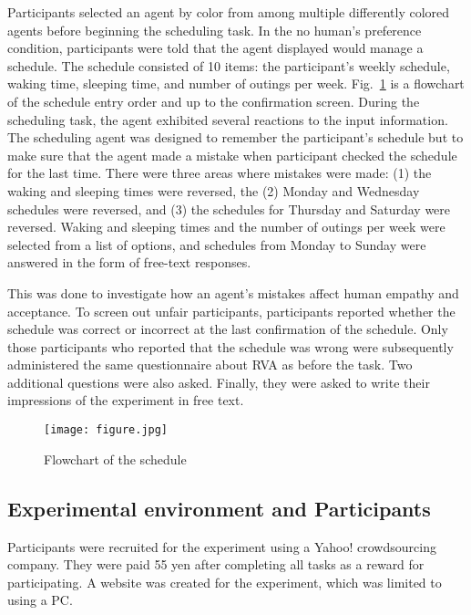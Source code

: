 \documentclass[runningheads]{llncs}
\begin{document}
Participants selected an agent by color from among multiple differently colored agents before beginning the scheduling task. 
In the no human's preference condition, participants were told that the agent displayed would manage a schedule. 
The schedule consisted of 10 items: the participant's weekly schedule, waking time, sleeping time, and number of outings per week. 
Fig.~\ref{flowchart} is a flowchart of the schedule entry order and up to the confirmation screen.
During the scheduling task, the agent exhibited several reactions to the input information. 
The scheduling agent was designed to remember the participant's schedule but to make sure that the agent made a mistake when participant checked the schedule for the last time. 
There were three areas where mistakes were made: 
(1) the waking and sleeping times were reversed, the (2) Monday and Wednesday schedules were reversed, and (3) the schedules for Thursday and Saturday were reversed.
Waking and sleeping times and the number of outings per week were selected from a list of options, and schedules from Monday to Sunday were answered in the form of free-text responses.

This was done to investigate how an agent's mistakes affect human empathy and acceptance. 
To screen out unfair participants, participants reported whether the schedule was correct or incorrect at the last confirmation of the schedule. 
Only those participants who reported that the schedule was wrong were subsequently administered the same questionnaire about RVA as before the task. 
Two additional questions were also asked. 
Finally, they were asked to write their impressions of the experiment in free text.

\begin{figure}[tbp]
		\begin{center}
		\texttt{[image: figure.jpg]}
		\caption{Flowchart of the schedule}
		\label{flowchart}
	\end{center}
\end{figure}

\subsection{Experimental environment and Participants}
Participants were recruited for the experiment using a Yahoo! crowdsourcing company.
They were paid 55 yen after completing all tasks as a reward for participating.
A website was created for the experiment, which was limited to using a PC.
\end{document}
